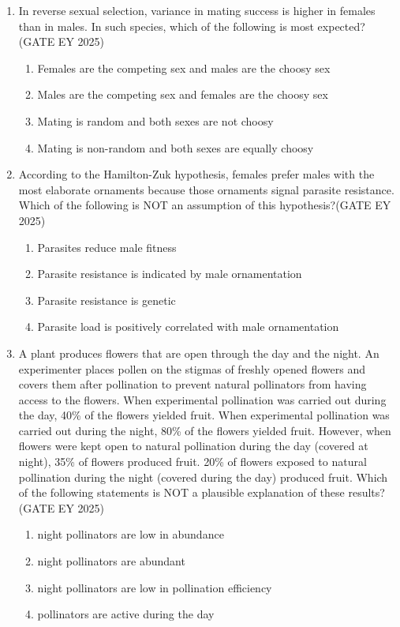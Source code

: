 \begin{enumerate}[leftmargin=*,label=\textbf{Q.\arabic*},resume]
\item In reverse sexual selection, variance in mating success is higher in females than in males. In such species, which of the following is most expected?\hfill {(GATE EY 2025)}
\begin{multicols}{2}
\begin{enumerate}
\item Females are the competing sex and males are the choosy sex
\item Males are the competing sex and females are the choosy sex
\item Mating is random and both sexes are not choosy
\item Mating is non-random and both sexes are equally choosy
\end{enumerate}
\end{multicols}

\item According to the Hamilton-Zuk hypothesis, females prefer males with the most elaborate ornaments because those ornaments signal parasite resistance. Which of the following is NOT an assumption of this hypothesis?\hfill {(GATE EY 2025)}
\begin{multicols}{2}
\begin{enumerate}
\item Parasites reduce male fitness
\item Parasite resistance is indicated by male ornamentation
\item Parasite resistance is genetic
\item Parasite load is positively correlated with male ornamentation
\end{enumerate}
\end{multicols}

\item A plant produces flowers that are open through the day and the night. An experimenter places pollen on the stigmas of freshly opened flowers and covers them after pollination to prevent natural pollinators from having access to the flowers. When experimental pollination was carried out during the day, 40\% of the flowers yielded fruit. When experimental pollination was carried out during the night, 80\% of the flowers yielded fruit. However, when flowers were kept open to natural pollination during the day (covered at night), 35\% of flowers produced fruit. 20\% of flowers exposed to natural pollination during the night (covered during the day) produced fruit. Which of the following statements is NOT a plausible explanation of these results?\hfill {(GATE EY 2025)}
\begin{multicols}{2}
\begin{enumerate}
\item night pollinators are low in abundance
\item night pollinators are abundant
\item night pollinators are low in pollination efficiency
\item pollinators are active during the day
\end{enumerate}
\end{multicols}


\end{enumerate}
